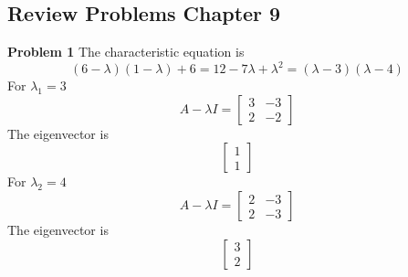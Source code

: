 \subsection{Review Problems Chapter 9}
\textbf{Problem 1}
The characteristic equation is 
\[
    (6-\lambda)(1-\lambda) + 6
    = 12 - 7\lambda + \lambda^2
    = (\lambda-3)(\lambda-4)
\]
For $\lambda_1 = 3$
\[
    A - \lambda I = \begin{bmatrix}
        3 & -3 \\
        2 & -2
    \end{bmatrix}
\]
The eigenvector is 
\[
    \begin{bmatrix}
        1 \\ 1
    \end{bmatrix}
\]
For $\lambda_2 = 4$
\[
    A -\lambda I= \begin{bmatrix}
        2 & -3 \\
        2 & -3
    \end{bmatrix}
\]
The eigenvector is 
\[
    \begin{bmatrix}
        3 \\ 2
    \end{bmatrix}
\]

